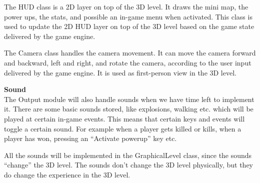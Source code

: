    The HUD class is a 2D layer on top of the 3D level. It draws the mini map, the power ups, the stats, and possible an in-game menu when activated. This class is used to update the 2D HUD layer on top of the 3D level based on the game state delivered by the game engine.
   
   The Camera class handles the camera movement. It can move the camera forward and backward, left and right, and rotate the camera, according to the user input delivered by the game engine. It is used as first-person view in the 3D level.
   
   \textbf{Sound} \\
   The Output module will also handle sounds when we have time left to implement it. There are some basic sounds stored, like explosions, walking etc. which will be played at certain in-game events. This means that certain keys and events will toggle a certain sound. For example when a player gets killed or kills, when a player has won, pressing an ``Activate powerup'' key etc.
   
   All the sounds will be implemented in the GraphicalLevel class, since the sounds ``change'' the 3D level. The sounds don't change the 3D level physically, but they do change the experience in the 3D level.

